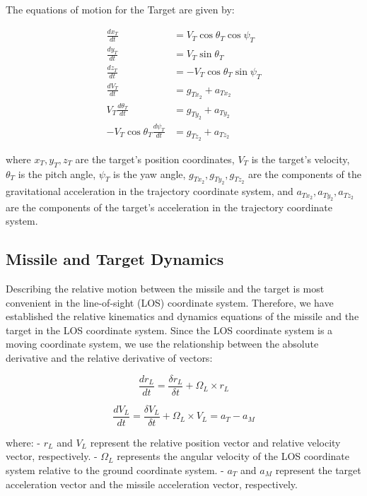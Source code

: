 \documentclass{article}
\begin{document}
\vspace{1cm}
  The equations of motion for the Target are given by:

\begin{align}
\frac{dx_T}{dt} &= V_T \cos \theta_T \cos \psi_T \\
\frac{dy_T}{dt} &= V_T \sin \theta_T \\
\frac{dz_T}{dt} &= -V_T \cos \theta_T \sin \psi_T \\
\frac{dV_T}{dt} &= g_{Tx_2} + a_{Tx_2} \\
V_T \frac{d\theta_T}{dt} &= g_{Ty_2} + a_{Ty_2} \\
-V_T \cos \theta_T \frac{d\psi_T}{dt} &= g_{Tz_2} + a_{Tz_2}
\end{align}

where \(x_T, y_T, z_T\) are the target's position coordinates, \(V_T\) is the target's velocity, \(\theta_T\) is the pitch angle, \(\psi_T\) is the yaw angle, \(g_{Tx_2}, g_{Ty_2}, g_{Tz_2}\) are the components of the gravitational acceleration in the trajectory coordinate system, and \(a_{Tx_2}, a_{Ty_2}, a_{Tz_2}\) are the components of the target's acceleration in the trajectory coordinate system.

    
\subsection{Missile and Target Dynamics}



Describing the relative motion between the missile and the target is most convenient in the line-of-sight (LOS) coordinate system. Therefore, we have established the relative kinematics and dynamics equations of the missile and the target in the LOS coordinate system. Since the LOS coordinate system is a moving coordinate system, we use the relationship between the absolute derivative and the relative derivative of vectors:

\[
\frac{dr_L}{dt} = \frac{\delta r_L}{\delta t} + \Omega_L \times r_L
\tag{1-22}
\]

\[
\frac{dV_L}{dt} = \frac{\delta V_L}{\delta t} + \Omega_L \times V_L = a_T - a_M
\tag{1-23}
\]

where:
- \( r_L \) and \( V_L \) represent the relative position vector and relative velocity vector, respectively.
- \( \Omega_L \) represents the angular velocity of the LOS coordinate system relative to the ground coordinate system.
- \( a_T \) and \( a_M \) represent the target acceleration vector and the missile acceleration vector, respectively.
\end{document}
